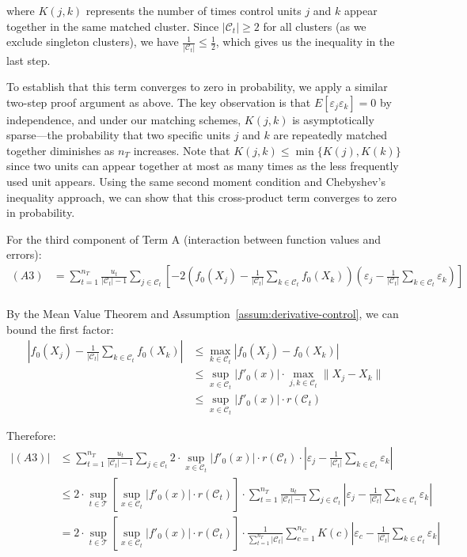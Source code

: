 \documentclass{mytemplate}
\begin{document}
where $K(j,k)$ represents the number of times control units $j$ and $k$ appear together in the same matched cluster. Since $|\mathcal{C}_t| \geq 2$ for all clusters (as we exclude singleton clusters), we have $\frac{1}{|\mathcal{C}_t|} \leq \frac{1}{2}$, which gives us the inequality in the last step. 

To establish that this term converges to zero in probability, we apply a similar two-step proof argument as above. The key observation is that $E[\varepsilon_j \varepsilon_k] = 0$ by independence, and under our matching schemes, $K(j,k)$ is asymptotically sparse—the probability that two specific units $j$ and $k$ are repeatedly matched together diminishes as $n_T$ increases. Note that $K(j,k) \leq \min\{K(j), K(k)\}$ since two units can appear together at most as many times as the less frequently used unit appears. Using the same second moment condition and Chebyshev's inequality approach, we can show that this cross-product term converges to zero in probability.


For the third component of Term A (interaction between function values and errors):
\begin{align*}
(A3) &= \sum_{t=1}^{n_T} \frac{u_t}{|\mathcal{C}_t|-1} \sum_{j \in \mathcal{C}_t}\left[-2\left(f_0(X_j)-\frac{1}{|\mathcal{C}_t|} \sum_{k \in \mathcal{C}_t} f_0(X_k)\right)\left(\varepsilon_j-\frac{1}{|\mathcal{C}_t|} \sum_{k \in \mathcal{C}_t} \varepsilon_k\right)\right] \\
\end{align*}

By the Mean Value Theorem and Assumption~\ref{assum:derivative-control}, we can bound the first factor:
\begin{align*}
\left|f_0(X_j)-\frac{1}{|\mathcal{C}_t|} \sum_{k \in \mathcal{C}_t} f_0(X_k)\right| &\leq \max_{k \in \mathcal{C}_t} |f_0(X_j) - f_0(X_k)| \\
&\leq \sup_{x \in \mathcal{C}_t} |f'_0(x)| \cdot \max_{j,k \in \mathcal{C}_t} \|X_j - X_k\| \\
&\leq \sup_{x \in \mathcal{C}_t} |f'_0(x)| \cdot r(\mathcal{C}_t)
\end{align*}

Therefore:
\begin{align*}
|(A3)| &\leq \sum_{t=1}^{n_T} \frac{u_t}{|\mathcal{C}_t|-1} \sum_{j \in \mathcal{C}_t} 2 \cdot \sup_{x \in \mathcal{C}_t} |f'_0(x)| \cdot r(\mathcal{C}_t) \cdot \left|\varepsilon_j-\frac{1}{|\mathcal{C}_t|} \sum_{k \in \mathcal{C}_t} \varepsilon_k\right| \\
&\leq 2 \cdot \sup_{t \in \mathcal{T}} \left[\sup_{x \in \mathcal{C}_t} |f'_0(x)| \cdot r(\mathcal{C}_t)\right] \cdot \sum_{t=1}^{n_T} \frac{u_t}{|\mathcal{C}_t|-1} \sum_{j \in \mathcal{C}_t} \left|\varepsilon_j-\frac{1}{|\mathcal{C}_t|} \sum_{k \in \mathcal{C}_t} \varepsilon_k\right| \\
&= 2 \cdot \sup_{t \in \mathcal{T}} \left[\sup_{x \in \mathcal{C}_t} |f'_0(x)| \cdot r(\mathcal{C}_t)\right] \cdot \frac{1}{\sum_{t=1}^{n_T}|\mathcal{C}_t|} \sum_{c=1}^{n_C} K(c) \left|\varepsilon_c - \frac{1}{|\mathcal{C}_t|} \sum_{k \in \mathcal{C}_t} \varepsilon_k\right|
\end{align*}
\end{document}
